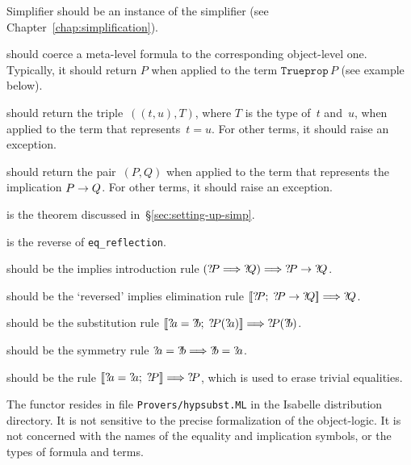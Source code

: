 \begin{ttdescription}
\item[Simplifier] should be an instance of the simplifier (see
  Chapter~\ref{chap:simplification}).
  
\item[\ttindexbold{dest_Trueprop}] should coerce a meta-level formula to the
  corresponding object-level one.  Typically, it should return $P$ when
  applied to the term $\texttt{Trueprop}\,P$ (see example below).
  
\item[\ttindexbold{dest_eq}] should return the triple~$((t,u),T)$, where $T$ is
  the type of~$t$ and~$u$, when applied to the \ML{} term that
  represents~$t=u$.  For other terms, it should raise an exception.
  
\item[\ttindexbold{dest_imp}] should return the pair~$(P,Q)$ when applied to
  the \ML{} term that represents the implication $P\rightarrow Q$.  For other terms,
  it should raise an exception.

\item[\tdxbold{eq_reflection}] is the theorem discussed
  in~\S\ref{sec:setting-up-simp}.
  
\item[\tdxbold{rev_eq_reflection}] is the reverse of \texttt{eq_reflection}.

\item[\tdxbold{imp_intr}] should be the implies introduction
rule $({?\!P}\Longrightarrow{?\!Q})\Longrightarrow {?\!P}\rightarrow{?\!Q}$.

\item[\tdxbold{rev_mp}] should be the `reversed' implies elimination
rule $\mathopen{[\![}{?\!P};  \;{?\!P}\rightarrow{?\!Q}\mathclose{]\!]} \Longrightarrow {?\!Q}$.

\item[\tdxbold{subst}] should be the substitution rule
$\List{\Var{a}=\Var{b};\; \Var{P}(\Var{a})} \Imp \Var{P}(\Var{b})$.

\item[\tdxbold{sym}] should be the symmetry rule
${?\!a}={?\!b}\Longrightarrow{?\!b}={?\!a}$.

\item[\tdxbold{thin_refl}] should be the rule
$\mathopen{[\![}{?\!a}={?\!a};\; {?\!P}\mathclose{]\!]} \Longrightarrow {?\!P}$, which is used to erase
trivial equalities.
\end{ttdescription}
%
The functor resides in file \texttt{Provers/hypsubst.ML} in the Isabelle
distribution directory.  It is not sensitive to the precise formalization
of the object-logic.  It is not concerned with the names of the equality
and implication symbols, or the types of formula and terms.  

